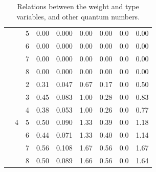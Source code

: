 \begin{table}[htbp]
\begin{tabular}{@{}ccccccccc@{}}
                             &                    & 5          & 0.00              & 0.000           & 0.00           & 0.00          & 0.0            & 0.00          \\
                             &                    & 6          & 0.00              & 0.000           & 0.00           & 0.00          & 0.0            & 0.00          \\
                             &                    & 7          & 0.00              & 0.000           & 0.00           & 0.00          & 0.0            & 0.00          \\
                             &                    & 8          & 0.00              & 0.000           & 0.00           & 0.00          & 0.0            & 0.00          \\
  \cmidrule(l){2-9}
                             & \multirow{7}{*}{4} & 2          & 0.31              & 0.047           & 0.67           & 0.17          & 0.0            & 0.50          \\
                             &                    & 3          & 0.45              & 0.083           & 1.00           & 0.28          & 0.0            & 0.83          \\
                             &                    & 4          & 0.38              & 0.053           & 1.00           & 0.26          & 0.0            & 0.77          \\
                             &                    & 5          & 0.50              & 0.090           & 1.33           & 0.39          & 0.0            & 1.18          \\
                             &                    & 6          & 0.44              & 0.071           & 1.33           & 0.40          & 0.0            & 1.14          \\
                             &                    & 7          & 0.56              & 0.108           & 1.67           & 0.56          & 0.0            & 1.67          \\
                             &                    & 8          & 0.50              & 0.089           & 1.66           & 0.56          & 0.0            & 1.64          \\ \bottomrule
  \end{tabular}%
  \caption{Relations between the weight and type variables, and other quantum numbers.}
  \label{tab:wzw:quantum}
\end{table}


